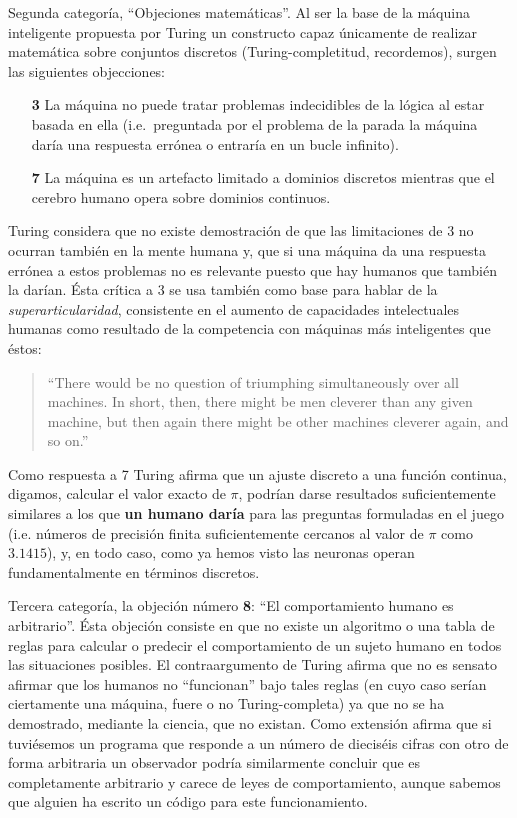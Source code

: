 \documentclass[12pt]{memoir}
\begin{document}
Segunda categoría, ``Objeciones matemáticas''. Al ser la base de la máquina inteligente propuesta por Turing un constructo capaz únicamente de realizar matemática sobre conjuntos discretos (Turing-completitud, recordemos), surgen las siguientes objecciones: 

\begin{enumerate}
    \item[\textbf{3}] La máquina no puede tratar problemas indecidibles de la lógica al estar basada en ella (i.e.\ preguntada por el problema de la parada la máquina daría una respuesta errónea o entraría en un bucle infinito).
    \item[\textbf{7}] La máquina es un artefacto limitado a dominios discretos mientras que el cerebro humano opera sobre dominios continuos.
\end{enumerate}

Turing considera que no existe demostración de que las limitaciones de 3 no ocurran también en la mente humana y, que si una máquina da una respuesta errónea a estos problemas no es relevante puesto que hay humanos que también la darían. Ésta crítica a 3 se usa también como base para hablar de la \textit{superarticularidad}, consistente en el aumento de capacidades intelectuales humanas como resultado de la competencia con máquinas más inteligentes que éstos:
\begin{quotation}
``There would be no question of triumphing simultaneously over all machines. In short, then, there might be men cleverer than any given machine, but then again there might be other machines cleverer again, and so on.'' \parencite[apartado 6, punto 3]{Turing1950cmi}
\end{quotation}

Como respuesta a 7 Turing afirma que un ajuste discreto a una función continua, digamos, calcular el valor exacto de $\pi$, podrían darse resultados suficientemente similares a los que \textbf{un humano daría} para las preguntas formuladas en el juego (i.e. números de precisión finita suficientemente cercanos al valor de $\pi$ como $3.1415$), y, en todo caso, como ya hemos visto las neuronas operan fundamentalmente en términos discretos.

Tercera categoría, la objeción número \textbf{8}: ``El comportamiento humano es arbitrario''. Ésta objeción consiste en que no existe un algoritmo o una tabla de reglas para calcular o predecir el comportamiento de un sujeto humano en todos las situaciones posibles. El contraargumento de Turing afirma que no es sensato afirmar que los humanos no ``funcionan'' bajo tales reglas (en cuyo caso serían ciertamente una máquina, fuere o no Turing-completa) ya que no se ha demostrado, mediante la ciencia, que no existan. Como extensión afirma que si tuviésemos un programa que responde a un número de dieciséis cifras con otro de forma arbitraria un observador podría similarmente concluir que es completamente arbitrario y carece de leyes de comportamiento, aunque sabemos que alguien ha escrito un código para este funcionamiento.
\end{document}
